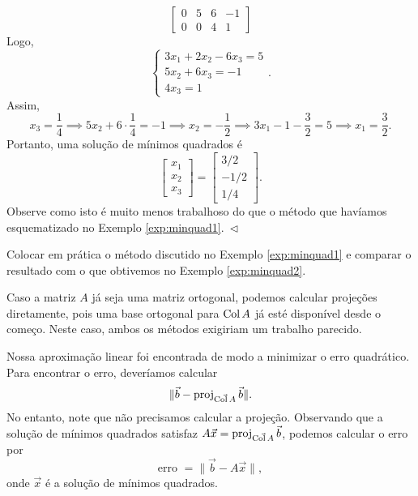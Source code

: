 \documentclass[../livro.tex]{subfiles}  %
\begin{document}
\begin{example}
\[\begin{bmatrix}
    0 & 5 &  6 & -1 \\
    0 & 0 &  4 & 1
  \end{bmatrix}
  \] Logo,
  \[
  \left\{
    \begin{array}{ll}
      3 x_1 + 2 x_2 - 6 x_3 = 5 \\
      5x_2 + 6 x_3 = -1 \\
      4x_3 = 1
    \end{array}
  \right..
  \] Assim,
  \[
  x_3 = \frac{1}{4} \implies 5x_2 + 6 \cdot \frac{1}{4} = -1 \implies x_2 = -\frac{1}{2} \implies 3 x_1 - 1 - \frac{3}{2}  = 5 \implies x_1 = \frac{3}{2}.
  \] Portanto, uma solução de mínimos quadrados é
  \[
  \begin{bmatrix}
    x_1 \\ x_2 \\ x_3
  \end{bmatrix} =
  \begin{bmatrix}
    3/2 \\ -1/2 \\ 1/4
  \end{bmatrix}.
  \] Observe como isto é muito menos trabalhoso do que o método que havíamos esquematizado no Exemplo \ref{exp:minquad1}$. \ \lhd$
\end{example}

\begin{exercise}
  Colocar em prática o método discutido no Exemplo \ref{exp:minquad1} e comparar o resultado com o que obtivemos no Exemplo \ref{exp:minquad2}.
\end{exercise}

\begin{remark}
  Caso a matriz $A$ já seja uma matriz ortogonal, podemos calcular projeções diretamente, pois uma base ortogonal para $\operatorname{Col} A$ já esté disponível desde o começo. Neste caso, ambos os métodos exigiriam um trabalho parecido.
\end{remark}

Nossa aproximação linear foi encontrada de modo a minimizar o erro quadrático. Para encontrar o erro, deveríamos calcular
\[
\| \vec{b} - \operatorname{proj}_{\vec{\operatorname{Col} A}} \vec{b} \|.
\] No entanto, note que não precisamos calcular a projeção. Observando que a solução de mínimos quadrados satisfaz $A \vec{x} = \operatorname{proj}_{\vec{\operatorname{Col} A}} \vec{b}$, podemos calcular o erro por
\[
\text{erro } = \| \vec{b} - A \vec{x} \|,
\] onde $\vec{x}$ é a solução de mínimos quadrados.
\end{document}
